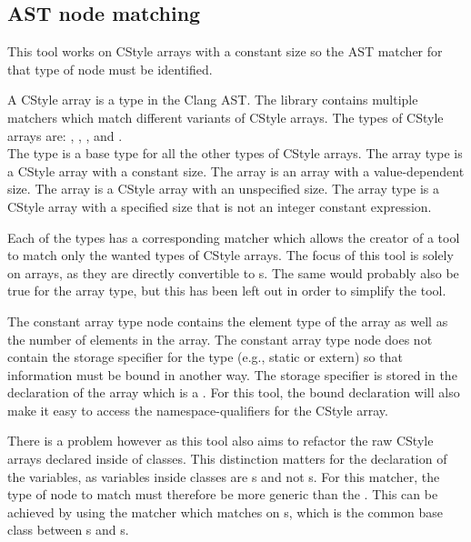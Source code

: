 \subsection{AST node matching}\label{subsec:085tool_example:030cstyle:node_matching}

This tool works on CStyle arrays with a constant size so the AST matcher for that type of node must be identified.

A CStyle array is a type in the Clang AST. The library contains multiple matchers which match different variants of CStyle arrays. The types of CStyle arrays are: , , ,  and . \\
The  type is a base type for all the other types of CStyle arrays. The  array type is a CStyle array with a constant size. The  array is an array with a value-dependent size. The  array is a CStyle array with an unspecified size. The  array type is a CStyle array with a specified size that is not an integer constant expression.

Each of the types has a corresponding matcher which allows the creator of a tool to match only the wanted types of CStyle arrays. The focus of this tool is solely on  arrays, as they are directly convertible to s. The same would probably also be true for the  array type, but this has been left out in order to simplify the tool.

The constant array type node contains the element type of the array as well as the number of elements in the array. The constant array type node does not contain the storage specifier for the type (e.g., static or extern) so that information must be bound in another way. The storage specifier is stored in the declaration of the array which is a . For this tool, the bound declaration will also make it easy to access the namespace-qualifiers for the CStyle array. 

There is a problem however as this tool also aims to refactor the raw CStyle arrays declared inside of classes. This distinction matters for the declaration of the variables, as variables inside classes are s and not s. For this matcher, the type of node to match must therefore be more generic than the . This can be achieved by using the  matcher which matches on s, which is the common base class between s and s.

